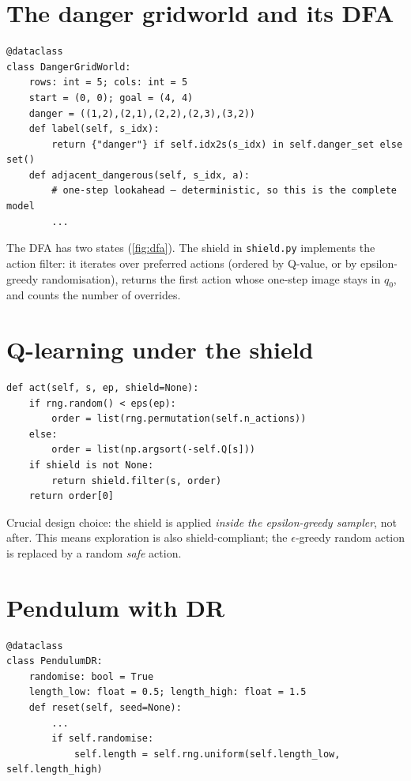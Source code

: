 \documentclass[11pt,oneside]{scrbook}
\begin{document}
\section{The danger gridworld and its DFA}

\begin{verbatim}
@dataclass
class DangerGridWorld:
    rows: int = 5; cols: int = 5
    start = (0, 0); goal = (4, 4)
    danger = ((1,2),(2,1),(2,2),(2,3),(3,2))
    def label(self, s_idx):
        return {"danger"} if self.idx2s(s_idx) in self.danger_set else set()
    def adjacent_dangerous(self, s_idx, a):
        # one-step lookahead — deterministic, so this is the complete model
        ...
\end{verbatim}

The DFA has two states (\cref{fig:dfa}). The shield in \texttt{shield.py}
implements the action filter: it iterates over preferred actions (ordered by
Q-value, or by epsilon-greedy randomisation), returns the first action whose
one-step image stays in $q_0$, and counts the number of overrides.

\section{Q-learning under the shield}

\begin{verbatim}
def act(self, s, ep, shield=None):
    if rng.random() < eps(ep):
        order = list(rng.permutation(self.n_actions))
    else:
        order = list(np.argsort(-self.Q[s]))
    if shield is not None:
        return shield.filter(s, order)
    return order[0]
\end{verbatim}

Crucial design choice: the shield is applied \emph{inside the epsilon-greedy
sampler}, not after. This means exploration is also shield-compliant; the
$\epsilon$-greedy random action is replaced by a random \emph{safe} action.

\section{Pendulum with DR}

\begin{verbatim}
@dataclass
class PendulumDR:
    randomise: bool = True
    length_low: float = 0.5; length_high: float = 1.5
    def reset(self, seed=None):
        ...
        if self.randomise:
            self.length = self.rng.uniform(self.length_low, self.length_high)
\end{verbatim}
\end{document}
